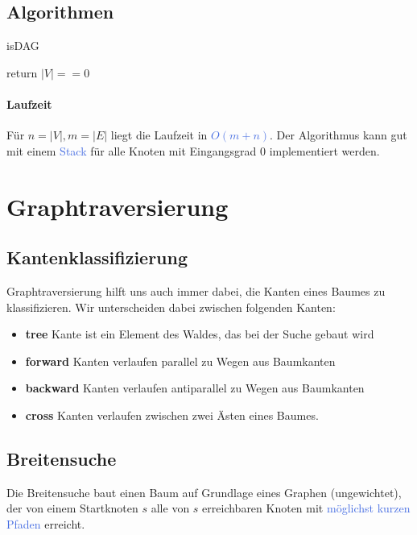 \documentclass[11pt]{article}
\def \texcol{RoyalBlue}
\begin{document}
\subsection{Algorithmen}
\begin{algorithm}[H]
\caption{isDAG}
\DontPrintSemicolon
{}
return $|V|==0$
\end{algorithm}

\paragraph{Laufzeit}
Für $n=|V|,m=|E|$ liegt die Laufzeit in \textcolor{\texcol}{$O(m+n)$}. Der Algorithmus kann gut mit einem \textcolor{\texcol}{Stack} für alle Knoten mit Eingangsgrad 0 implementiert werden.

\section{Graphtraversierung}

\subsection{Kantenklassifizierung}
Graphtraversierung hilft uns auch immer dabei, die Kanten eines Baumes zu klassifizieren. Wir unterscheiden dabei zwischen folgenden Kanten:

\begin{itemize}
\item \textbf{tree} Kante ist ein Element des Waldes, das bei der Suche gebaut wird
\item \textbf{forward} Kanten verlaufen parallel zu Wegen aus Baumkanten
\item \textbf{backward} Kanten verlaufen antiparallel zu Wegen aus Baumkanten
\item \textbf{cross} Kanten verlaufen zwischen zwei Ästen eines Baumes.
\end{itemize}

\subsection{Breitensuche}
Die Breitensuche baut einen Baum auf Grundlage eines Graphen (ungewichtet), der von einem Startknoten $s$ alle von $s$ erreichbaren Knoten mit \textcolor{\texcol}{möglichst kurzen Pfaden} erreicht.
\end{document}
